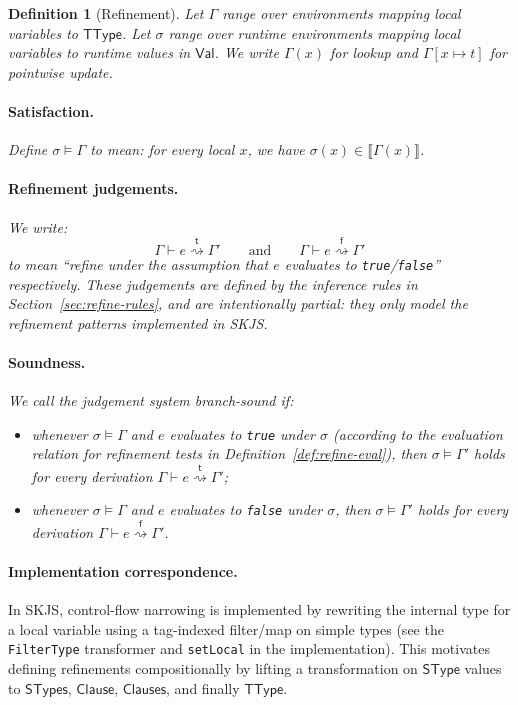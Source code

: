 \documentclass[11pt]{article}
\newtheorem{definition}[theorem]{Definition}
\newcommand{\sem}[1]{\llbracket #1 \rrbracket}
\newcommand{\SType}{\mathsf{SType}}
\newcommand{\TType}{\mathsf{TType}}
\newcommand{\Clauses}{\mathsf{Clauses}}
\newcommand{\Clause}{\mathsf{Clause}}
\newcommand{\STypes}{\mathsf{STypes}}
\newcommand{\Val}{\mathsf{Val}}
\newcommand{\Env}{\Gamma}
\newcommand{\RefineT}[3]{#1 \vdash #2 \stackrel{\mathsf{t}}{\rightsquigarrow} #3}
\newcommand{\RefineF}[3]{#1 \vdash #2 \stackrel{\mathsf{f}}{\rightsquigarrow} #3}
\begin{document}
\begin{definition}[Refinement]
\label{def:refinement}
Let $\Env$ range over environments mapping local variables to $\TType$.
Let $\sigma$ range over runtime environments mapping local variables to runtime values in $\Val$.
We write $\Env(x)$ for lookup and $\Env[x \mapsto t]$ for pointwise update.

\paragraph{Satisfaction.}
Define $\sigma \models \Env$ to mean: for every local $x$, we have $\sigma(x) \in \sem{\Env(x)}$.

\paragraph{Refinement judgements.}
We write:
\[
\RefineT{\Env}{e}{\Env'}
\qquad\text{and}\qquad
\RefineF{\Env}{e}{\Env'}
\]
to mean ``refine under the assumption that $e$ evaluates to \texttt{true}/\texttt{false}'' respectively.
These judgements are defined by the inference rules in Section~\ref{sec:refine-rules}, and are intentionally partial: they only model the refinement patterns implemented in SKJS.

\paragraph{Soundness.}
We call the judgement system \emph{branch-sound} if:
\begin{itemize}
\item whenever $\sigma \models \Env$ and $e$ evaluates to \texttt{true} under $\sigma$ (according to the evaluation relation for refinement tests in Definition~\ref{def:refine-eval}),
then $\sigma \models \Env'$ holds for every derivation $\RefineT{\Env}{e}{\Env'}$;
\item whenever $\sigma \models \Env$ and $e$ evaluates to \texttt{false} under $\sigma$,
then $\sigma \models \Env'$ holds for every derivation $\RefineF{\Env}{e}{\Env'}$.
\end{itemize}
\end{definition}

\paragraph{Implementation correspondence.}
In SKJS, control-flow narrowing is implemented by rewriting the internal type for a local variable using a tag-indexed
filter/map on simple types (see the \texttt{FilterType} transformer and \texttt{setLocal} in the implementation).
This motivates defining refinements compositionally by lifting a transformation on $\SType$ values to $\STypes$, $\Clause$, $\Clauses$, and finally $\TType$.
\end{document}
